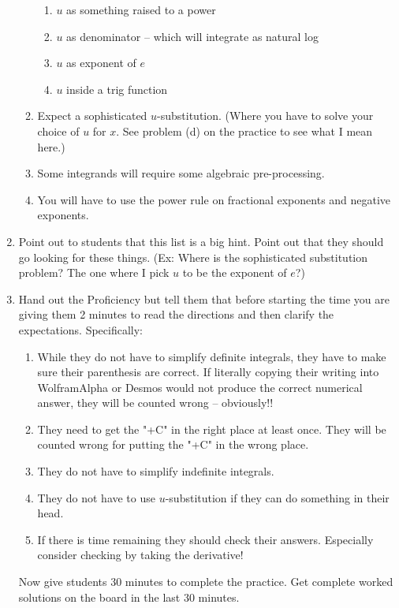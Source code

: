 \documentclass[12pt]{article}
\begin{document}
\begin{enumerate}
\begin{enumerate}
		\begin{enumerate}
		\item $u$ as something raised to a power 
		\item $u$ as denominator -- which will integrate as natural log
		\item $u$ as exponent of $e$
		\item $u$ inside a trig function
		\end{enumerate} 
	\item Expect a sophisticated $u$-substitution. (Where you have to solve your choice of $u$ for $x$. See problem (d) on the practice to see what I mean here.)
	\item Some integrands will require some algebraic pre-processing.
	\item You will have to use the power rule on fractional exponents and negative exponents.
	\end{enumerate}
\item Point out to students that this list is a big hint. Point out that they should go looking for these things. (Ex: Where is the sophisticated substitution problem? The one where I pick $u$ to be the exponent of $e$?)
\item Hand out the Proficiency but tell them that before starting the time you are giving them 2 minutes to read the directions and then clarify the expectations. Specifically:
	\begin{enumerate}
	\item While they do not have to simplify definite integrals, they have to make sure their parenthesis are correct. If literally copying their writing into WolframAlpha or Desmos would not produce the correct numerical answer, they will be counted wrong -- obviously!!
	\item They need to get the "+C" in the right place at least once. They will be counted wrong for putting the "+C" in the wrong place.
	\item They do not have to simplify indefinite integrals. 
	\item They do not have to use $u$-substitution if they can do something in their head.
	\item If there is time remaining they should check their answers. Especially consider checking by taking the derivative!
	\end{enumerate}
Now give students 30 minutes to complete the practice. Get complete worked solutions on the board in the last 30 minutes.
\end{enumerate}
\end{document}
